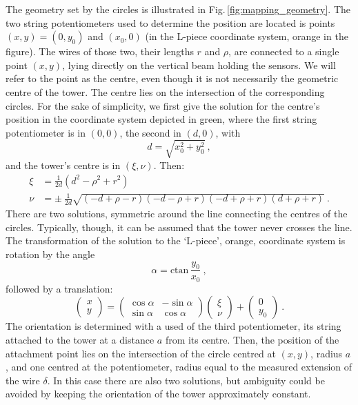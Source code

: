 The geometry set by the circles is illustrated in Fig.\,\ref{fig:mapping_geometry}. The two string potentiometers used to determine the position are located is points $(x, y) = (0, y_0)$ and $(x_0, 0)$ (in the L-piece coordinate system, orange in the figure).
The wires of those two, their lengths $r$ and $\rho$, are connected to a single point $(x,y)$, lying directly on the vertical beam holding the sensors. We will refer to the point as the centre, even though it is not necessarily the geometric centre of the tower. The centre lies on the intersection of the corresponding circles.
For the sake of simplicity, we first give the solution for the centre's position in the coordinate system depicted in green,
where the first string potentiometer is in $(0,0)$, the second in $(d, 0)$, with
\begin{equation}
  d = \sqrt{x_0^2 + y_0^2} \ ,
\end{equation}
and the tower's centre is in $(\xi, \nu)$. Then: 
\begin{align}
  \xi & = \frac{1}{2d} \left( d^2 - \rho^2 + r^2 \right) \\
  \nu & = \pm\ \frac{1}{2d} \sqrt{ (-d + \rho - r) (-d - \rho + r) (-d + \rho + r) (d + \rho + r) } \ .
\end{align}
There are two solutions, symmetric around the line connecting the centres of the circles. Typically, though, it can be assumed that the tower never crosses the line.
The transformation of the solution to the `L-piece', orange, coordinate system is rotation by the angle 
\begin{equation}
  \alpha = \mathrm{ctan}\, \frac{y_0}{x_0} \ ,
\end{equation}
followed by a translation:
\begin{equation}
  \begin{pmatrix}
    x \\
    y
  \end{pmatrix}
  =
  \begin{pmatrix}
    \cos \alpha & -\sin \alpha \\
    \sin \alpha & \cos \alpha
  \end{pmatrix}
  \begin{pmatrix}
    \xi \\
    \nu
  \end{pmatrix}
  +
  \begin{pmatrix}
    0 \\
    y_0
  \end{pmatrix} \ .
\end{equation}
The orientation is determined with a used of the third potentiometer, its string attached to the tower at a distance $a$ from its centre. Then, the position of the attachment point lies on the intersection of the circle centred at $(x,y)$, radius $a$, and one centred at the potentiometer, radius equal to the measured extension of the wire $\delta$. In this case there are also two solutions, but ambiguity could be avoided by keeping the orientation of the tower approximately constant.

